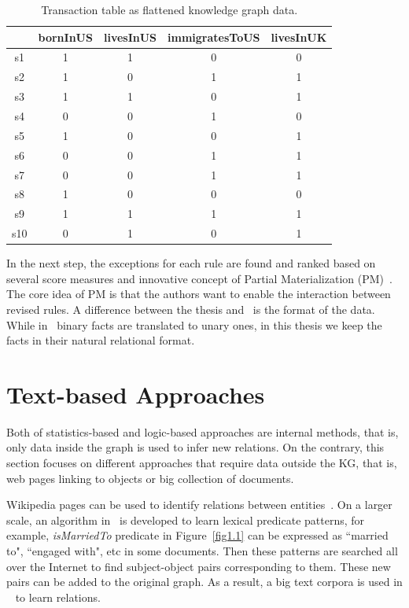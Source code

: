 \begin{table}
\begin{center}
\begin{tabular}{|c|c|c|c|c|}
\hline
 & bornInUS & livesInUS & immigratesToUS & livesInUK\\
\hline\hline
s1 & 1 & 1 & 0 & 0\\
\hline
s2 & 1 & 0 & 1 & 1\\
\hline
s3 & 1 & 1 & 0 & 1\\
\hline
s4 & 0 & 0 & 1 & 0\\
\hline
s5 & 1 & 0 & 0 & 1\\
\hline
s6 & 0 & 0 & 1 & 1\\
\hline
s7 & 0 & 0 & 1 & 1\\
\hline
s8 & 1 & 0 & 0 & 0\\
\hline
s9 & 1 & 1 & 1 & 1\\
\hline
s10 & 0 & 1 & 0 & 1\\
\hline
\end{tabular}
\end{center}
\caption{Transaction table as flattened knowledge graph data.}
\label{table2}
\end{table}

In the next step, the exceptions for each rule are found and ranked based on several score measures and innovative concept of Partial Materialization (PM)~\cite{ref12}. The core idea of PM is that the authors want to enable the interaction between revised rules. A difference between the thesis and~\cite{ref12} is the format of the data. While in~\cite{ref12} binary facts are translated to unary ones, in this thesis we keep the facts in their natural relational format.

\section{Text-based Approaches}

Both of statistics-based and logic-based approaches are internal methods, that is, only data inside the graph is used to infer new relations. On the contrary, this section focuses on different approaches that require data outside the KG, that is, web pages linking to objects or big collection of documents.

Wikipedia pages can be used to identify relations between entities~\cite{ref18}. On a larger scale, an algorithm in~\cite{ref19} is developed to learn lexical predicate patterns, for example, \textit{isMarriedTo} predicate in Figure~\ref{fig1.1} can be expressed  as ``married to", ``engaged with", etc in some documents. Then these patterns are searched all over the Internet to find subject-object pairs corresponding to them. These new pairs can be added to the original graph. As a result, a big text corpora is used in ~\cite{ref19} to learn relations.

